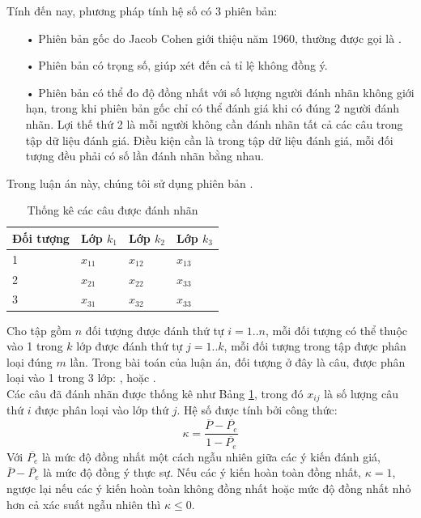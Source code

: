 Tính đến nay, phương pháp tính hệ số  có 3 phiên bản:
\begin{itemize}
\item[•] Phiên bản gốc do Jacob Cohen giới thiệu năm 1960, thường được gọi là .
\item[•] Phiên bản  có trọng số, giúp xét đến cả tỉ lệ không đồng ý.
\item[•] Phiên bản  có thể đo độ đồng nhất với số lượng người đánh nhãn không giới hạn, trong khi phiên bản gốc chỉ có thể đánh giá khi có đúng 2 người đánh nhãn. Lợi thế thứ 2 là mỗi người không cần đánh nhãn tất cả các câu trong tập dữ liệu đánh giá. Điều kiện cần là trong tập dữ liệu đánh giá, mỗi đối tượng đều phải có số lần đánh nhãn bằng nhau.
\end{itemize}
Trong luận án này, chúng tôi sử dụng phiên bản .
\begin{table}[t]
\centering
\caption{Thống kê các câu được đánh nhãn} \label{table:kappa}
\begin{tabular}{| l | l | l | l |}
\hline
\textbf{Đối tượng} & \textbf{Lớp $k_1$} & \textbf{Lớp $k_2$} & \textbf{Lớp $k_3$} \\
\hline
1            & $x_{11}$             & $x_{12}$               & $x_{13}$             \\
\hline
2            & $x_{21}$             & $x_{22}$              & $x_{33}$             \\
\hline
3            & $x_{31}$             & $x_{32}$              & $x_{33}$            \\
\hline
\end{tabular}
\end{table}
Cho tập gồm $n$ đối tượng được đánh thứ tự $i=1..n$, mỗi đối tượng có thể thuộc vào 1 trong $k$ lớp được đánh thứ tự $j=1..k$, mỗi đối tượng trong tập được phân loại đúng $m$ lần. Trong bài toán của luận án, đối tượng ở đây là câu, được phân loại vào 1 trong 3 lớp: \tichcuc, \tieucuc hoặc \trungtinh.\\

 Các câu đã đánh nhãn được thống kê như Bảng \ref{table:kappa}, trong đó $x_{ij}$ là số lượng câu thứ $i$ được phân loại vào lớp thứ $j$.
Hệ số  được tính bởi công thức:
\begin{equation} \label{eq:0}
\kappa = \dfrac{\overline{P} - \overline{P_e}}{1 - \overline{P_e}}
\end{equation}
Với $\overline{P_e}$ là mức độ đồng nhất một cách ngẫu nhiên giữa các ý kiến đánh giá, $\overline{P} - \overline{P_e}$ là mức độ đồng ý thực sự. Nếu các ý kiến hoàn toàn đồng nhất, $\kappa=1$, ngược lại nếu các ý kiến hoàn toàn không đồng nhất hoặc mức độ đồng nhất nhỏ hơn cả xác suất ngẫu nhiên thì $\kappa \leq 0$.\\

